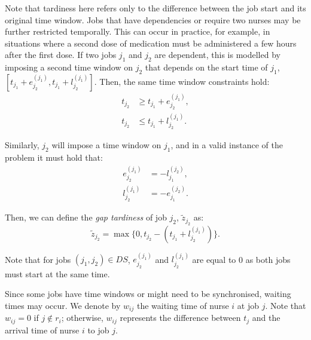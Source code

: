 \documentclass[a4paper,11pt,authoryear]{elsarticle}
\begin{document}
\noindent Note that tardiness here refers only to the difference between the job start and its original time window. Jobs that have dependencies or require two nurses may be further restricted temporally. This can occur in practice, for example, in situations where a second dose of medication must be administered a few hours after the first dose. If two jobs $j_1$ and $j_2$ are dependent, this is modelled by imposing a second time window on $j_2$ that depends on the start time of $j_1$, $[t_{j_1} + e_{j_2}^{(j_1)}, t_{j_1} + l_{j_2}^{(j_1)}]$. Then, the same time window constraints hold:
\begin{subequations}
	\begin{align}
	t_{j_2} &\geq t_{j_1} + e^{(j_1)}_{j_2}, \label{eq:timewindow1}\\[3pt] %
	t_{j_2} &\leq t_{j_1} + l^{(j_1)}_{j_2}. \label{eq:timewindow2} %
	\end{align}
\end{subequations}

\noindent Similarly, $j_2$ will impose a time window on $j_1$, and in a valid instance of the problem it must hold that:
\begin{subequations}
	\begin{align}
		e^{(j_1)}_{j_2} &= -l^{(j_2)}_{j_1}, \label{eq:earliesttimedependecies}\\[3pt]
		l^{(j_1)}_{j_2} &= -e^{(j_2)}_{j_1}. \label{eq:latesttimedependencies}
	\end{align}
\end{subequations}

\noindent Then, we can define the \emph{gap tardiness} of job $j_2$, $\tilde{z}_{j_2}$ as:
\begin{equation}
    \tilde{z}_{j_2} = \max\{0, t_{j_2} - (t_{j_1} + l_{j_2}^{(j_1)})\}. \label{eq:gaptardiness}
\end{equation}

\noindent Note that for jobs $(j_1, j_2) \in DS$, $e_{j_2}^{(j_1)}$ and $l_{j_2}^{(j_1)}$ are equal to 0 as both jobs must start at the same time.

Since some jobs have time windows or might need to be synchronised, waiting times may occur. We denote by $w_{ij}$ the waiting time of nurse $i$ at job $j$. Note that $w_{ij} = 0$ if $j \notin r_i$; otherwise, $w_{ij}$ represents the difference between $t_j$ and the arrival time of nurse $i$ to job $j$.%

\end{document}
